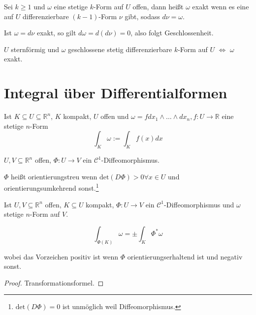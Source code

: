 \begin{definition}[Exaktheit]
	Sei $k\geq 1$ und $\omega$ eine stetige $k$-Form auf $U$ offen, dann hei\ss t $\omega$ exakt wenn es eine auf $U$ differenzierbare $(k-1)$-Form $\nu$ gibt, sodass $d\nu = \omega$.
\end{definition}
\begin{remark}
	Ist $\omega=d\nu$ exakt, so gilt $d\omega = d(d\nu) = 0$, also folgt Geschlossenheit.
\end{remark}
\begin{theorem}[Poincar\'e]
	$U$ sternf\"ormig und $\omega$ geschlossene stetig differenzierbare $k$-Form auf $U$ $\Leftrightarrow$ $\omega$ exakt.
\end{theorem}








\section{Integral \"uber Differentialformen}
\begin{definition}
	Ist $K\subseteq U \subseteq \mathbb R^n$, $K$ kompakt, $U$ offen und $\omega=fdx_1\wedge\dots\wedge dx_n, f:U\rightarrow \mathbb R$ eine stetige $n$-Form
	$$\int_K \omega := \int_K f(x)dx$$
\end{definition}

\begin{definition}
	$U,V \subseteq \mathbb R^n$ offen, $\Phi:U\rightarrow V$ ein $\mathcal C^1$-Diffeomorphismus.
	
	$\Phi$ hei\ss t orientierungstreu wenn $\text{det}(D\Phi)>0 \forall x\in U$ und orientierungsumkehrend sonst.\footnote{$\text{det}(D\Phi)=0$ ist unm\"oglich weil Diffeomorphismus.}
\end{definition}

\begin{theorem}
	Ist $U,V \subseteq \mathbb R^n$ offen, $K\subseteq U$ kompakt, $\Phi:U\rightarrow V$ ein $\mathcal C^1$-Diffeomorphismus und $\omega$ stetige $n$-Form auf $V$.
	
	$$\int_{\Phi(K)} \omega = \pm \int_K \Phi^*\omega$$
	
	wobei das Vorzeichen positiv ist wenn $\Phi$ orientierungserhaltend ist und negativ sonst.
\end{theorem}
\begin{proof}
	Transformationsformel.
\end{proof}








